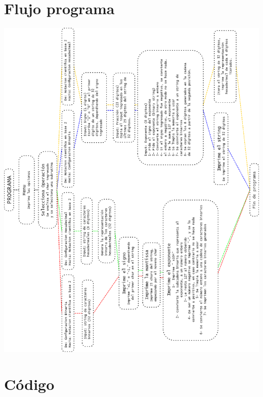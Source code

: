 \documentclass{article}
\begin{document}
\section{Flujo programa}
\begin{center}
  \includegraphics[scale=0.4]{diagrama.png}
\end{center}

\newpage
\section{Código}
\end{document}
